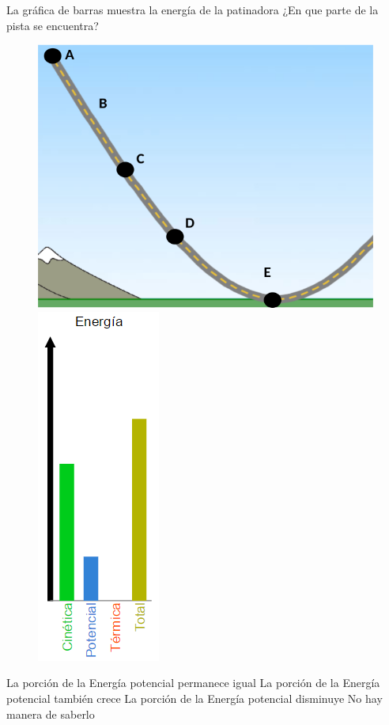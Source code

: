 La gráfica de barras muestra la energía de la patinadora ¿En que parte de la pista se encuentra?

\begin{minipage}{0.4\textwidth}
    \begin{figure}[H]
        \includegraphics[width=.72\linewidth]{../images/q028d}
        \includegraphics[width=.22\linewidth]{../images/q028e}
    \end{figure}
\end{minipage}\hfill
\begin{minipage}{0.6\textwidth}
    \begin{choices}
        \choice La porción de la Energía potencial permanece igual
        \choice La porción de la Energía potencial también crece
        \choice La porción de la Energía potencial disminuye
        \choice No hay manera de saberlo
    \end{choices}
\end{minipage}
